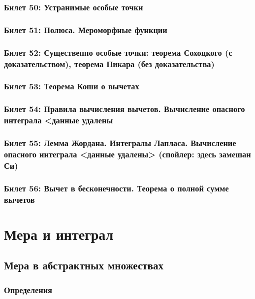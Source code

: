 \documentclass[12pt, a4paper, oneside]{memoir}
\begin{document}
\subsection{Билет 50: Устранимые особые точки}

\subsection{Билет 51: Полюса. Мероморфные функции}

\subsection{Билет 52: Существенно особые точки: теорема Сохоцкого (с доказательством), теорема Пикара (без доказательства)}

\subsection{Билет 53: Теорема Коши о вычетах}

\subsection{Билет 54: Правила вычисления вычетов. Вычисление опасного интеграла <данные удалены}

\subsection{Билет 55: Лемма Жордана. Интегралы Лапласа. Вычисление опасного интеграла <данные удалены> (спойлер: здесь замешан Си)}

\subsection{Билет 56: Вычет в бесконечности. Теорема о полной сумме вычетов}






\chapter{Мера и интеграл}


\section{Мера в абстрактных множествах}

\subsection{Определения}
\end{document}
